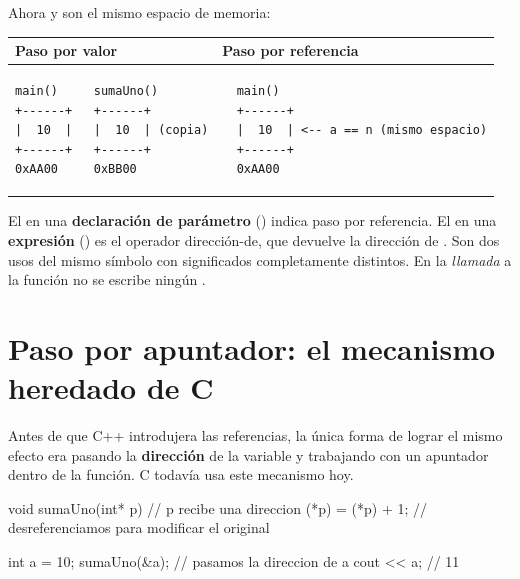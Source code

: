 \documentclass[12pt, oneside]{article}
\begin{document}
Ahora  y  son el mismo espacio de memoria:

\begin{center}
\begin{tabular}{p{5cm} p{7cm}}
\toprule
\textbf{Paso por valor} & \textbf{Paso por referencia} \\
\midrule
\begin{verbatim}
main()     sumaUno()
+------+   +------+
|  10  |   |  10  | (copia)
+------+   +------+
0xAA00     0xBB00
\end{verbatim}
&
\begin{verbatim}
  main()
  +------+
  |  10  | <-- a == n (mismo espacio)
  +------+
  0xAA00
\end{verbatim}
\\
\bottomrule
\end{tabular}
\end{center}

\begin{advertencia}
  El \cpp{\&} en una \textbf{declaración de parámetro} () indica
  paso por referencia. El \cpp{\&} en una \textbf{expresión} () es el
  operador dirección-de, que devuelve la dirección de . Son dos usos del
  mismo símbolo con significados completamente distintos. En la \textit{llamada}
  a la función no se escribe ningún \cpp{\&}.
\end{advertencia}

\section{Paso por apuntador: el mecanismo heredado de C}

Antes de que C++ introdujera las referencias, la única forma de lograr el mismo
efecto era pasando la \textbf{dirección} de la variable y trabajando con un apuntador
dentro de la función. C todavía usa este mecanismo hoy.

\begin{codigo}[caption={Paso por apuntador}]
void sumaUno(int* p) {   // p recibe una direccion
    (*p) = (*p) + 1;     // desreferenciamos para modificar el original
}

int a = 10;
sumaUno(&a);             // pasamos la direccion de a
cout << a;               // 11
\end{codigo}
\end{document}
